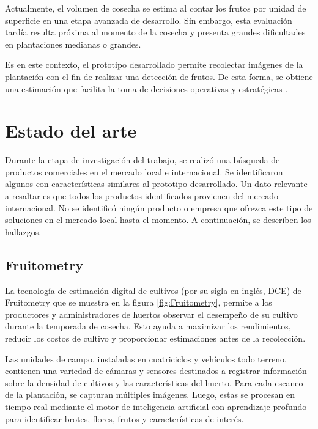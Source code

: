 Actualmente, el volumen de cosecha se estima al contar los frutos por unidad de superficie en una etapa avanzada de desarrollo. Sin embargo, esta evaluación tardía resulta  próxima al momento de la cosecha y presenta grandes dificultades en plantaciones medianas o grandes.

Es en este contexto, el prototipo desarrollado permite recolectar imágenes de la plantación con el fin de realizar una detección de frutos. De esta forma, se obtiene una estimación que facilita la toma de decisiones operativas y
estratégicas \citep{Mendoza2021}.


\section{Estado del arte}

Durante la etapa de investigación del trabajo, se realizó una búsqueda de productos comerciales en el mercado local e internacional. Se identificaron algunos con características similares al prototipo desarrollado. Un dato relevante a resaltar es que todos los productos identificados provienen del mercado internacional. No se identificó ningún producto o empresa que ofrezca este tipo de soluciones en el mercado local hasta el momento. A continuación, se describen los hallazgos.

\subsection{Fruitometry}

La tecnología de estimación digital de cultivos (por su sigla en inglés, DCE) de Fruitometry que se muestra en la figura \ref{fig:Fruitometry}, permite a los productores y administradores de huertos observar el desempeño de su cultivo durante la temporada de cosecha. Esto ayuda a maximizar los rendimientos, reducir los costos de cultivo y proporcionar estimaciones antes de la recolección.

Las unidades de campo, instaladas en cuatriciclos y vehículos todo terreno, contienen una variedad de cámaras y sensores destinados a registrar información sobre la densidad de cultivos y las características del huerto. Para cada escaneo de la plantación, se capturan múltiples imágenes. Luego, estas se procesan en tiempo real mediante el motor de inteligencia artificial con aprendizaje profundo para identificar brotes, flores, frutos y características de interés.

